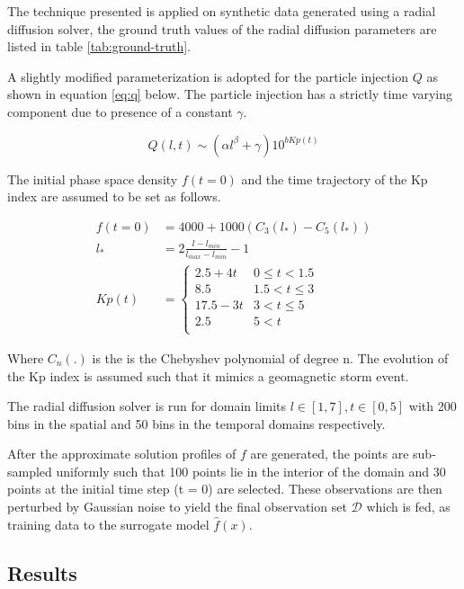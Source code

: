 The technique presented is applied on synthetic data generated using a radial diffusion solver, 
the ground truth values of the radial diffusion parameters are listed in table \ref{tab:ground-truth}.

A slightly modified parameterization is adopted for the particle injection $Q$ as shown in equation \ref{eq:q} below. The particle injection has a strictly time varying component due to presence of a constant $\gamma$.

\begin{equation}\label{eq:q}
Q(l,t)  \sim (\alpha l^{\beta} + \gamma) 10^{b Kp(t)}
\end{equation}

The initial phase space density $f(t = 0)$ and the time trajectory 
of the Kp index are assumed to be set as follows.

\begin{align}
f(t = 0) &= 4000 + 1000(C_{3}(l_*) - C_{5}(l_*)) \\
l_* &= 2\frac{l - l_{min}}{l_{max} - l_{min}} - 1 \\
Kp(t) &= \left\{\begin{matrix}
2.5 + 4t & 0 \leq t < 1.5\\ 
8.5 & 1.5 < t \leq 3\\ 
17.5-3t & 3 <  t \leq 5 \\ 
2.5 & 5 < t\\ 
\end{matrix}\right.
\end{align}

Where $C_n(.)$ is the is the Chebyshev polynomial of degree n. 
The evolution of the Kp index \citet{BartelsKp} is assumed such that it mimics a geomagnetic storm event. 

The radial diffusion solver is run for domain limits $l \in [1, 7], t \in [0, 5]$ with
200 bins in the spatial and 50 bins in the temporal domains respectively.

After the approximate solution profiles of $f$ are generated, the points are sub-sampled
uniformly such that 100 points lie in the interior of the domain and 30 points at the initial time step (t = 0) are selected. These observations are then perturbed by Gaussian noise to yield
the final observation set $\mathcal{D}$ which is fed, as training data to the surrogate model $\hat{f}(x)$.

\subsection*{Results}

